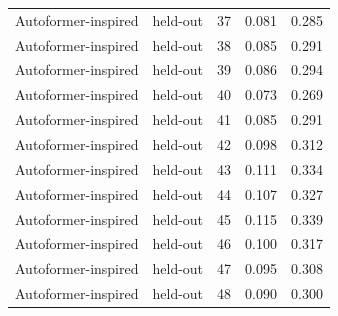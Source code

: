 \begin{tabular}{llrrr}
Autoformer-inspired & held-out & 37 & 0.081 & 0.285 \\
Autoformer-inspired & held-out & 38 & 0.085 & 0.291 \\
Autoformer-inspired & held-out & 39 & 0.086 & 0.294 \\
Autoformer-inspired & held-out & 40 & 0.073 & 0.269 \\
Autoformer-inspired & held-out & 41 & 0.085 & 0.291 \\
Autoformer-inspired & held-out & 42 & 0.098 & 0.312 \\
Autoformer-inspired & held-out & 43 & 0.111 & 0.334 \\
Autoformer-inspired & held-out & 44 & 0.107 & 0.327 \\
Autoformer-inspired & held-out & 45 & 0.115 & 0.339 \\
Autoformer-inspired & held-out & 46 & 0.100 & 0.317 \\
Autoformer-inspired & held-out & 47 & 0.095 & 0.308 \\
Autoformer-inspired & held-out & 48 & 0.090 & 0.300 \\
\bottomrule
\end{tabular}
